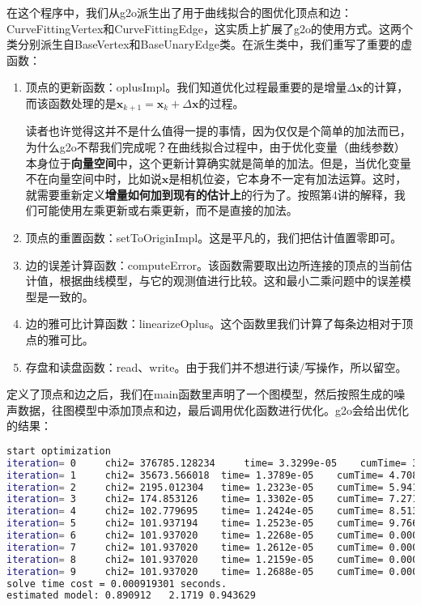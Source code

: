 在这个程序中，我们从g2o派生出了用于曲线拟合的图优化顶点和边：CurveFittingVertex和CurveFittingEdge，这实质上扩展了g2o的使用方式。这两个类分别派生自BaseVertex和BaseUnaryEdge类。在派生类中，我们重写了重要的虚函数：

\begin{enumerate}
	\item 顶点的更新函数：oplusImpl。我们知道优化过程最重要的是增量$\Delta \bm{x}$的计算，而该函数处理的是$\bm{x}_{k+1} = \bm{x}_k + \Delta \bm{x}$的过程。
	
	读者也许觉得这并不是什么值得一提的事情，因为仅仅是个简单的加法而已，为什么g2o不帮我们完成呢？在曲线拟合过程中，由于优化变量（曲线参数）本身位于\textbf{向量空间}中，这个更新计算确实就是简单的加法。但是，当优化变量不在向量空间中时，比如说$\bm{x}$是相机位姿，它本身不一定有加法运算。这时，就需要重新定义\textbf{增量如何加到现有的估计上}的行为了。按照第4讲的解释，我们可能使用左乘更新或右乘更新，而不是直接的加法。
	
	\item 顶点的重置函数：setToOriginImpl。这是平凡的，我们把估计值置零即可。
	
	\item 边的误差计算函数：computeError。该函数需要取出边所连接的顶点的当前估计值，根据曲线模型，与它的观测值进行比较。这和最小二乘问题中的误差模型是一致的。
    
    \item 边的雅可比计算函数：linearizeOplus。这个函数里我们计算了每条边相对于顶点的雅可比。
	
	\item 存盘和读盘函数：read、write。由于我们并不想进行读/写操作，所以留空。
\end{enumerate}

定义了顶点和边之后，我们在main函数里声明了一个图模型，然后按照生成的噪声数据，往图模型中添加顶点和边，最后调用优化函数进行优化。g2o会给出优化的结果：

\clearpage
\begin{lstlisting}[language=sh,caption=终端输出：]
start optimization
iteration= 0	 chi2= 376785.128234	 time= 3.3299e-05	 cumTime= 3.3299e-05	 edges= 100	 schur= 0
iteration= 1	 chi2= 35673.566018	 time= 1.3789e-05	 cumTime= 4.7088e-05	 edges= 100	 schur= 0
iteration= 2	 chi2= 2195.012304	 time= 1.2323e-05	 cumTime= 5.9411e-05	 edges= 100	 schur= 0
iteration= 3	 chi2= 174.853126	 time= 1.3302e-05	 cumTime= 7.2713e-05	 edges= 100	 schur= 0
iteration= 4	 chi2= 102.779695	 time= 1.2424e-05	 cumTime= 8.5137e-05	 edges= 100	 schur= 0
iteration= 5	 chi2= 101.937194	 time= 1.2523e-05	 cumTime= 9.766e-05	 edges= 100	 schur= 0
iteration= 6	 chi2= 101.937020	 time= 1.2268e-05	 cumTime= 0.000109928	 edges= 100	 schur= 0
iteration= 7	 chi2= 101.937020	 time= 1.2612e-05	 cumTime= 0.00012254	 edges= 100	 schur= 0
iteration= 8	 chi2= 101.937020	 time= 1.2159e-05	 cumTime= 0.000134699	 edges= 100	 schur= 0
iteration= 9	 chi2= 101.937020	 time= 1.2688e-05	 cumTime= 0.000147387	 edges= 100	 schur= 0
solve time cost = 0.000919301 seconds. 
estimated model: 0.890912   2.1719 0.943629
\end{lstlisting}

